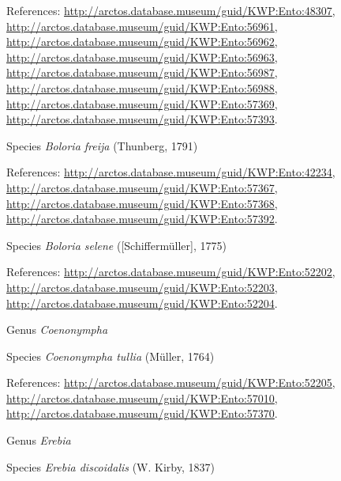 \documentclass[9pt, article]{memoir}
\begin{document}
\begin{multicols}{2}
\vspace{6pt}References: 
\url{http://arctos.database.museum/guid/KWP:Ento:48307}, 
\url{http://arctos.database.museum/guid/KWP:Ento:56961}, 
\url{http://arctos.database.museum/guid/KWP:Ento:56962}, 
\url{http://arctos.database.museum/guid/KWP:Ento:56963}, 
\url{http://arctos.database.museum/guid/KWP:Ento:56987}, 
\url{http://arctos.database.museum/guid/KWP:Ento:56988}, 
\url{http://arctos.database.museum/guid/KWP:Ento:57369}, 
\url{http://arctos.database.museum/guid/KWP:Ento:57393}.

\vspace{6pt}\noindent\hspace{36pt}Species \textit{Boloria freija} (Thunberg, 1791)


\vspace{6pt}References: 
\url{http://arctos.database.museum/guid/KWP:Ento:42234}, 
\url{http://arctos.database.museum/guid/KWP:Ento:57367}, 
\url{http://arctos.database.museum/guid/KWP:Ento:57368}, 
\url{http://arctos.database.museum/guid/KWP:Ento:57392}.

\vspace{6pt}\noindent\hspace{36pt}Species \textit{Boloria selene} ([Schiffermüller], 1775)


\vspace{6pt}References: 
\url{http://arctos.database.museum/guid/KWP:Ento:52202}, 
\url{http://arctos.database.museum/guid/KWP:Ento:52203}, 
\url{http://arctos.database.museum/guid/KWP:Ento:52204}.

\vspace{6pt}\noindent\hspace{30pt}Genus \textit{Coenonympha}


\vspace{6pt}\noindent\hspace{36pt}Species \textit{Coenonympha tullia} (Müller, 1764)


\vspace{6pt}References: 
\url{http://arctos.database.museum/guid/KWP:Ento:52205}, 
\url{http://arctos.database.museum/guid/KWP:Ento:57010}, 
\url{http://arctos.database.museum/guid/KWP:Ento:57370}.

\vspace{6pt}\noindent\hspace{30pt}Genus \textit{Erebia}


\vspace{6pt}\noindent\hspace{36pt}Species \textit{Erebia discoidalis} (W. Kirby, 1837)



\end{multicols}
\end{document}
